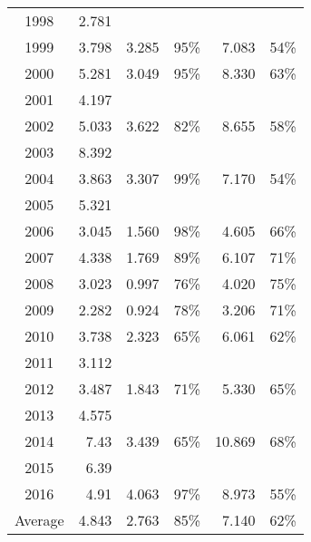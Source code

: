 \documentclass[]{article}
\begin{document}
\begin{table}[ht]
\begin{tabular}{crrrrr}
1998    &   2.781   &       &       &       &       \\
1999    &   3.798   &   3.285   &   95\% &   7.083   &   54\% \\
2000    &   5.281   &   3.049   &   95\% &   8.330   &   63\% \\
2001    &   4.197   &       &       &       &       \\
2002    &   5.033   &   3.622   &   82\% &   8.655   &   58\% \\
2003    &   8.392   &       &       &       &       \\
2004    &   3.863   &   3.307   &   99\% &   7.170   &   54\% \\
2005    &   5.321   &       &       &       &       \\
2006    &   3.045   &   1.560   &   98\% &   4.605   &   66\% \\
2007    &   4.338   &   1.769   &   89\% &   6.107   &   71\% \\
2008    &   3.023   &   0.997   &   76\% &   4.020   &   75\% \\
2009    &   2.282   &   0.924   &   78\% &   3.206   &   71\% \\
2010    &   3.738   &   2.323   &   65\% &   6.061   &   62\% \\
2011    &   3.112   &       &       &       &       \\
2012    &   3.487   &   1.843   &   71\% &   5.330   &   65\% \\
2013    &   4.575   &       &       &       &       \\
2014    &   7.43    &   3.439   &   65\% &   10.869  &   68\% \\
2015    &   6.39    &       &       &       &       \\
2016    &   4.91    &   4.063   &   97\% &   8.973   &   55\% \\
\hline
Average &   4.843   &   2.763   &   85\% &   7.140   &   62\%  \\
\hline
\end{tabular}
\end{table}
\end{document}
